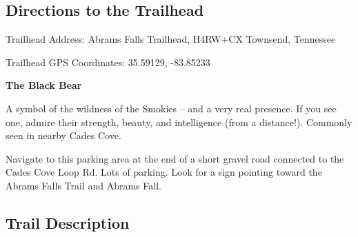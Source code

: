 \documentclass[
  letterpaper,
  DIV=11,
  numbers=noendperiod]{scrreprt}
\begin{document}
\subsection{Directions to the
Trailhead}\label{directions-to-the-trailhead-27}

Trailhead Address: Abrams Falls Trailhead, H4RW+CX Townsend, Tennessee

Trailhead GPS Coordinates: 35.59129, -83.85233

\begin{tcolorbox}[enhanced jigsaw, opacityback=0, bottomrule=.15mm, colframe=quarto-callout-note-color-frame, breakable, arc=.35mm, leftrule=.75mm, rightrule=.15mm, toprule=.15mm, left=2mm, colback=white]
\begin{minipage}[t]{5.5mm}
\textcolor{quarto-callout-note-color}{\faInfo}
\end{minipage}%
\begin{minipage}[t]{\textwidth - 5.5mm}

\vspace{-3mm}\textbf{The Black Bear}\vspace{3mm}

A symbol of the wildness of the Smokies -- and a very real presence. If
you see one, admire their strength, beauty, and intelligence (from a
distance!). Commonly seen in nearby Cades Cove.

\end{minipage}%
\end{tcolorbox}

Navigate to this parking area at the end of a short gravel road
connected to the Cades Cove Loop Rd. Lots of parking. Look for a sign
pointing toward the Abrams Falls Trail and Abrams Fall.

\subsection{Trail Description}\label{trail-description-27}
\end{document}
